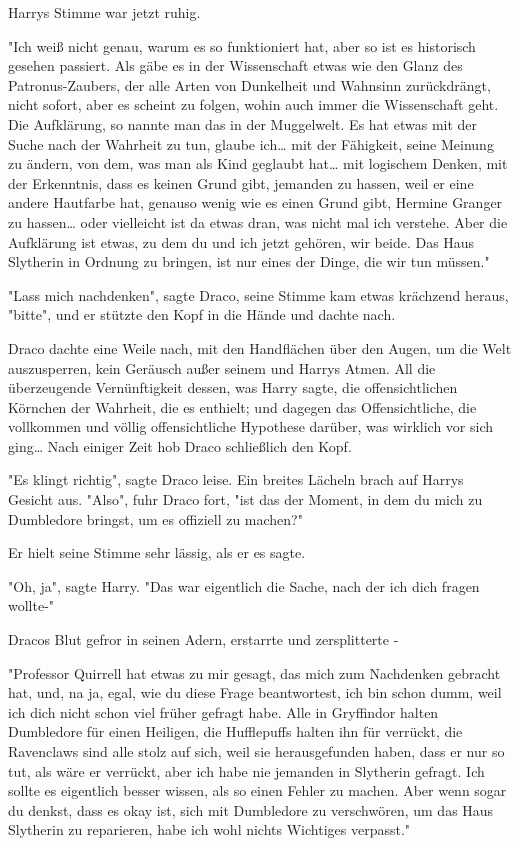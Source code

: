 {Harrys Stimme war jetzt ruhig.

"Ich weiß nicht genau, warum es so funktioniert hat, aber so ist es historisch gesehen passiert. Als gäbe es in der Wissenschaft etwas wie den Glanz des Patronus-Zaubers, der alle Arten von Dunkelheit und Wahnsinn zurückdrängt, nicht sofort, aber es scheint zu folgen, wohin auch immer die Wissenschaft geht. Die Aufklärung, so nannte man das in der Muggelwelt. Es hat etwas mit der Suche nach der Wahrheit zu tun, glaube ich… mit der Fähigkeit, seine Meinung zu ändern, von dem, was man als Kind geglaubt hat… mit logischem Denken, mit der Erkenntnis, dass es keinen Grund gibt, jemanden zu hassen, weil er eine andere Hautfarbe hat, genauso wenig wie es einen Grund gibt, Hermine Granger zu hassen… oder vielleicht ist da etwas dran, was nicht mal ich verstehe. Aber die Aufklärung ist etwas, zu dem du und ich jetzt gehören, wir beide. Das Haus Slytherin in Ordnung zu bringen, ist nur eines der Dinge, die wir tun müssen."

"Lass mich nachdenken", sagte Draco, seine Stimme kam etwas krächzend heraus, "bitte", und er stützte den Kopf in die Hände und dachte nach.

Draco dachte eine Weile nach, mit den Handflächen über den Augen, um die Welt auszusperren, kein Geräusch außer seinem und Harrys Atmen. All die überzeugende Vernünftigkeit dessen, was Harry sagte, die offensichtlichen Körnchen der Wahrheit, die es enthielt; und dagegen das Offensichtliche, die vollkommen und völlig offensichtliche Hypothese darüber, was wirklich vor sich ging… Nach einiger Zeit hob Draco schließlich den Kopf.

"Es klingt richtig", sagte Draco leise. Ein breites Lächeln brach auf Harrys Gesicht aus. "Also", fuhr Draco fort, "ist das der Moment, in dem du mich zu Dumbledore bringst, um es offiziell zu machen?"

Er hielt seine Stimme sehr lässig, als er es sagte.

"Oh, ja", sagte Harry. "Das war eigentlich die Sache, nach der ich dich fragen wollte-"

Dracos Blut gefror in seinen Adern, erstarrte und zersplitterte -

"Professor Quirrell hat etwas zu mir gesagt, das mich zum Nachdenken gebracht hat, und, na ja, egal, wie du diese Frage beantwortest, ich bin schon dumm, weil ich dich nicht schon viel früher gefragt habe. Alle in Gryffindor halten Dumbledore für einen Heiligen, die Hufflepuffs halten ihn für verrückt, die Ravenclaws sind alle stolz auf sich, weil sie herausgefunden haben, dass er nur so tut, als wäre er verrückt, aber ich habe nie jemanden in Slytherin gefragt. Ich sollte es eigentlich besser wissen, als so einen Fehler zu machen. Aber wenn sogar du denkst, dass es okay ist, sich mit Dumbledore zu verschwören, um das Haus Slytherin zu reparieren, habe ich wohl nichts Wichtiges verpasst."

}
